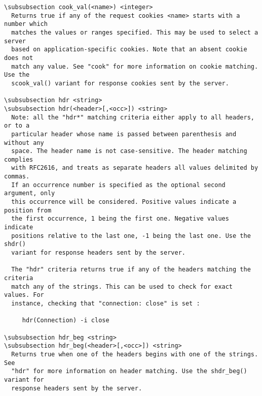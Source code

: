 \begin{verbatim}
\subsubsection cook_val(<name>) <integer>
  Returns true if any of the request cookies <name> starts with a number which
  matches the values or ranges specified. This may be used to select a server
  based on application-specific cookies. Note that an absent cookie does not
  match any value. See "cook" for more information on cookie matching. Use the
  scook_val() variant for response cookies sent by the server.

\subsubsection hdr <string>
\subsubsection hdr(<header>[,<occ>]) <string>
  Note: all the "hdr*" matching criteria either apply to all headers, or to a
  particular header whose name is passed between parenthesis and without any
  space. The header name is not case-sensitive. The header matching complies
  with RFC2616, and treats as separate headers all values delimited by commas.
  If an occurrence number is specified as the optional second argument, only
  this occurrence will be considered. Positive values indicate a position from
  the first occurrence, 1 being the first one. Negative values indicate
  positions relative to the last one, -1 being the last one. Use the shdr()
  variant for response headers sent by the server.

  The "hdr" criteria returns true if any of the headers matching the criteria
  match any of the strings. This can be used to check for exact values. For
  instance, checking that "connection: close" is set :

     hdr(Connection) -i close

\subsubsection hdr_beg <string>
\subsubsection hdr_beg(<header>[,<occ>]) <string>
  Returns true when one of the headers begins with one of the strings. See
  "hdr" for more information on header matching. Use the shdr_beg() variant for
  response headers sent by the server.


\end{verbatim}
